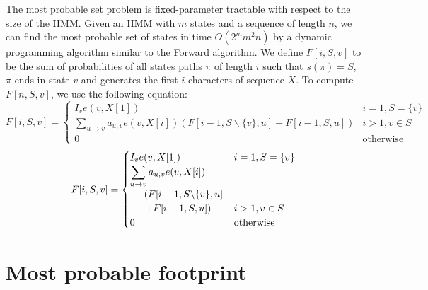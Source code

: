 The most probable set problem is
fixed-parameter tractable with respect to the size of the HMM. Given
an HMM with $m$ states and a sequence of length $n$, we can find the
most probable set of states in time $O(2^m m^2 n)$ by a dynamic
programming algorithm similar to the Forward algorithm.
We define $F[i,S,v]$ to be the sum of probabilities of all
states paths $\pi$ of length $i$ such that $s(\pi)=S$, $\pi$ ends in
state $v$ and generates the first $i$ characters of sequence $X$.
To compute $F[n,S,v]$, we use the following equation:
\ifx\settwocolumn\undefined
$$F[i,S,v] = \begin{cases}
I_{v}e(v,X[1])& i=1,S=\{v\}\\ 
\displaystyle \sum_{u\to v}a_{u,v}e(v,X[i])\left(F[i-1,S\backslash\{v\},u]
+ F[i-1,S,u]\right) & i>1, v\in S\\
0 & \mbox{otherwise}
\end{cases}$$
\else
$$F[i,S,v] = \begin{cases}
I_{v}e(v,X[1])& i=1,S=\{v\}\\ 
\displaystyle \sum_{u\to v}a_{u,v}e(v,X[i])\\\hspace{5mm}\left(F[i-1,S\backslash\{v\},u]\right.
\\\hspace{5mm}\left.
+ F[i-1,S,u]\right) & i>1, v\in S\\
0 & \mbox{otherwise}
\end{cases}$$
\fi

\section{Most probable footprint}
\label{sec:footprint}

